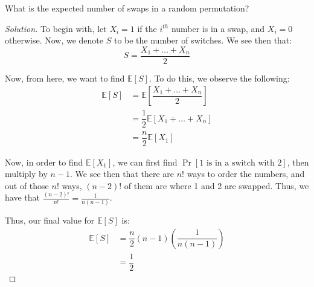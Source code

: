 \documentclass{article}
\newenvironment{solution}{\begin{proof}[Solution]}{\end{proof}}
\begin{document}
\begin{hw}
	What is the expected number of swaps in a random permutation?
\end{hw}
\begin{solution}
	To begin with, let $X_{i} = 1$ if the $i^{th}$ number is in a swap, and $X_{i} = 0$ otherwise. Now, we denote $S$ to be the number of switches. We see then that:
	\begin{equation*}
		S = \dfrac{X_{1} + \ldots + X_{n}}{2}
	\end{equation*}

	Now, from here, we want to find $\mathbb{E}[S]$. To do this, we observe the following:
	\begin{align*}
		\mathbb{E}[S] &= \mathbb{E}\left[ \dfrac{X_{1} + \ldots + X_{n}}{2} \right] \\
		&= \dfrac{1}{2}\mathbb{E}[X_{1} + \ldots + X_{n}] \\
		&= \dfrac{n}{2}\mathbb{E}[X_{1}]
	\end{align*}

	Now, in order to find $\mathbb{E}[X_{1}]$, we can first find $\Pr[1 \text{ is in a switch with 2}]$, then multiply by $n-1$. We see then that there are $n!$ ways to order the numbers, and out of those $n!$ ways, $(n-2)!$ of them are where 1 and 2 are swapped. Thus, we have that $\frac{(n-2)!}{n!} = \frac{1}{n(n-1)}$.
	
	Thus, our final value for $\mathbb{E}[S]$ is:
	\begin{align*}
		\mathbb{E}[S] &= \dfrac{n}{2}(n-1)\left( \dfrac{1}{n(n-1)} \right) \\
		&= \dfrac{1}{2}
	\end{align*}
\end{solution}
\end{document}
